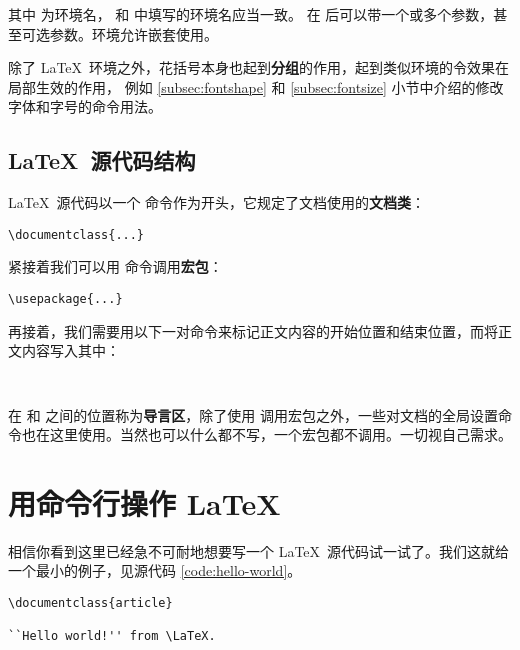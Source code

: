 其中  为环境名， 和  中填写的环境名应当一致。
 在  后可以带一个或多个参数，甚至可选参数。环境允许嵌套使用。

除了 \LaTeX\ 环境之外，花括号本身也起到\textbf{分组}的作用，起到类似环境的令效果在局部生效的作用，
例如 \ref{subsec:fontshape} 和 \ref{subsec:fontsize} 小节中介绍的修改字体和字号的命令用法。

\subsection{\LaTeX\ 源代码结构}\label{subsec:struct}

\LaTeX\ 源代码以一个  命令作为开头，它规定了文档使用的\textbf{文档类}：
\begin{verbatim}
\documentclass{...}
\end{verbatim}

紧接着我们可以用  命令调用\textbf{宏包}：
\begin{verbatim}
\usepackage{...}
\end{verbatim}

再接着，我们需要用以下一对命令来标记正文内容的开始位置和结束位置，而将正文内容写入其中：
\begin{verbatim}


\end{verbatim}

在  和  之间的位置称为\textbf{导言区}，除了使用 
调用宏包之外，一些对文档的全局设置命令也在这里使用。当然也可以什么都不写，一个宏包都不调用。一切视自己需求。

\section{用命令行操作 \LaTeX}\label{sec:run}

相信你看到这里已经急不可耐地想要写一个 \LaTeX\ 源代码试一试了。我们这就给一个最小的例子，见源代码 \ref{code:hello-world}。

\begin{sourcecode}[htp]
\begin{Verbatim}
\documentclass{article}

``Hello world!'' from \LaTeX.

\end{Verbatim}
\caption{\LaTeX\ 的一个最简单的源代码示例。}\label{code:hello-world}
\end{sourcecode}

